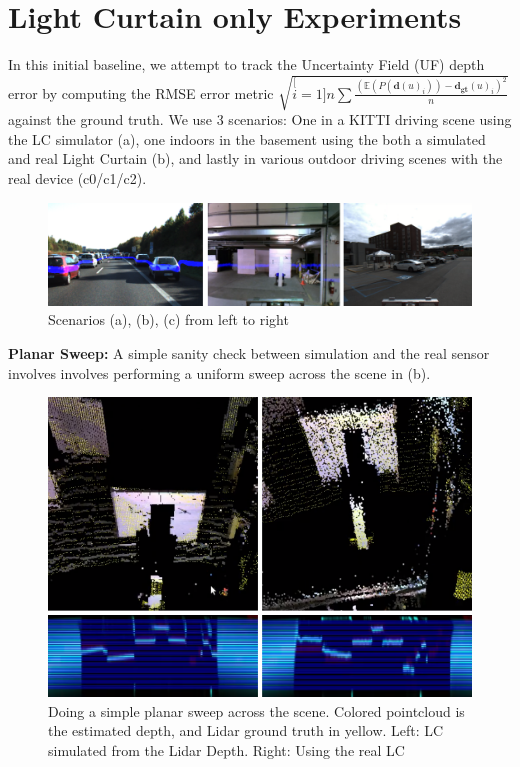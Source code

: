 
\section{Light Curtain only Experiments}

In this initial baseline, we attempt to track the Uncertainty Field (UF) depth error by computing the RMSE error metric $\sqrt{\stackrel[i=1]{n}{\sum}\frac{\left(\mathbb{E}\left(P(\mathbf{d}(u)_{i})\right)-\mathbf{d_{gt}}(u)_{i}\right)^{2}}{n}}$ against the ground truth. We use 3 scenarios: One in a KITTI driving scene using the LC simulator (a), one indoors in the basement using the both a simulated and real Light Curtain (b), and lastly in various outdoor driving scenes with the real device (c0/c1/c2).

\begin{figure}[h]
   \centering
   \begin{minipage}{0.5\textwidth}
       \centering
       \includegraphics[width=1.0\textwidth]{figures/exp.png}
   \end{minipage}\hfill
   \centering
   \caption{Scenarios (a), (b), (c) from left to right}
   \label{fig:exp}
\end{figure}

\textbf{Planar Sweep:} A simple sanity check between simulation and the real sensor involves involves performing a uniform sweep across the scene in (b). 

\begin{figure}
   \centering
   \begin{minipage}{0.5\textwidth}
       \centering
       \includegraphics[width=1.0\textwidth]{figures/sweep.png}
   \end{minipage}\hfill
   \centering
   \caption{Doing a simple planar sweep across the scene. Colored pointcloud is the estimated depth, and Lidar ground truth in yellow. Left: LC simulated from the Lidar Depth. Right: Using the real LC}
   \label{fig:planarsweep}
\end{figure}

